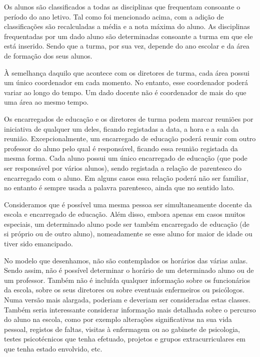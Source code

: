 \documentclass[12pt,a4paper,reqno]{report}
\numberwithin{figure}{section}
\numberwithin{equation}{section}
\begin{document}
Os alunos são classificados a todas as disciplinas que frequentam consoante o período do ano letivo. Tal como foi mencionado acima, com a adição de classificações são recalculadas a média e a nota máxima do aluno. As disciplinas frequentadas por um dado aluno são determinadas consoante a turma em que ele está inserido. Sendo que a turma, por sua vez, depende do ano escolar e da área de formação dos seus alunos.

À semelhança daquilo que acontece com os diretores de turma, cada área possui um único coordenador em cada momento. No entanto, esse coordenador poderá variar ao longo do tempo. Um dado docente não é coordenador de mais do que uma área ao mesmo tempo.

Os encarregados de educação e os diretores de turma podem marcar reuniões por iniciativa de qualquer um deles, ficando registadas a data, a hora e a sala da reunião. Excepcionalmente, um encarregado de educação poderá reunir com outro professor do aluno pelo qual é responsável, ficando essa reunião registada da mesma forma. Cada aluno possui um único encarregado de educação (que pode ser responsável por vários alunos), sendo registada a relação de parentesco do encarregado com o aluno. Em alguns casos essa relação poderá não ser familiar, no entanto é sempre usada a palavra parentesco, ainda que no sentido lato.

Consideramos que é possível uma mesma pessoa ser simultaneamente docente da escola e encarregado de educação. Além disso, embora apenas em casos muitos especiais, um determinado aluno pode ser também encarregado de educação (de si próprio ou de outro aluno), nomeadamente se esse aluno for maior de idade ou tiver sido emancipado.

No modelo que desenhamos, não são contemplados os horários das várias aulas. Sendo assim, não é possível determinar o horário de um determinado aluno ou de um professor. Também não é incluída qualquer informação sobre os funcionários da escola, sobre os seus diretores ou sobre eventuais enfermeiros ou psicólogos. Numa versão mais alargada, poderiam e deveriam ser consideradas estas classes. Também seria interessante considerar informação mais detalhada sobre o percurso do aluno na escola, como por exemplo alterações significativas na sua vida pessoal, registos de faltas, visitas à enfermagem ou ao gabinete de psicologia, testes psicotécnicos que tenha efetuado, projetos e grupos extracurriculares em que tenha estado envolvido, etc.

\end{document}
